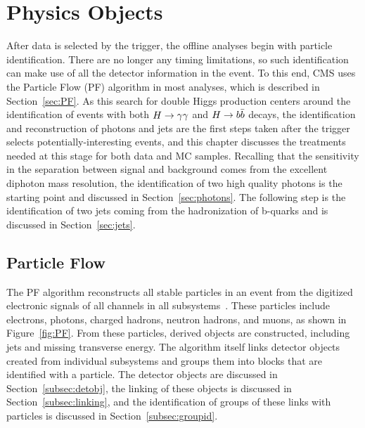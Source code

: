 \chapter{Physics Objects\label{ch:objects}}

After data is selected by the trigger, the offline analyses begin with particle identification.
There are no longer any timing limitations, so such identification can make use of all the detector
information in the event. To this end, CMS uses the Particle Flow (PF) algorithm
in most analyses, which is described in Section~\ref{sec:PF}.
As this search for double Higgs production centers around the identification of
events with both $H\to\gamma\gamma$ and $H\to b\bar{b}$ decays, the
identification and reconstruction of photons and jets are the first steps taken after the
trigger selects potentially-interesting events,
and this chapter discusses the treatments needed at this stage for both data and MC samples.
Recalling that the sensitivity in the separation between signal and background comes from the
excellent diphoton mass resolution, the identification of two high quality photons is the starting point
and discussed in Section~\ref{sec:photons}. The following step is the identification of two jets
coming from the hadronization of b-quarks and is discussed in Section~\ref{sec:jets}.


\section{Particle Flow\label{sec:PF}}

The PF algorithm reconstructs all stable particles in an event from the digitized electronic signals
of all channels in all subsystems~\cite{PFPAS2009,CMS-PAS-PFT-10-001}. These particles include
electrons, photons, charged hadrons, neutron hadrons, and muons, as shown in Figure~\ref{fig:PF}.
From these particles, derived objects are constructed, including jets and missing transverse energy.
The algorithm itself links detector objects created from individual subsystems and groups them into
blocks that are identified with a particle. The detector objects are discussed in
Section~\ref{subsec:detobj}, the linking of these objects is discussed in Section~\ref{subsec:linking},
and the identification of groups of these links with particles is discussed in
Section~\ref{subsec:groupid}.

